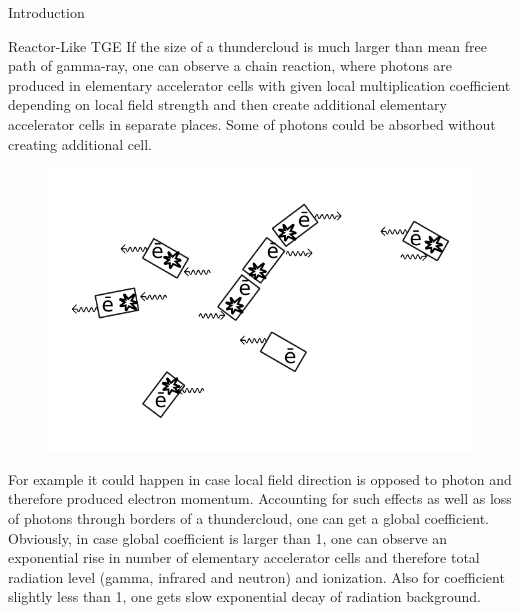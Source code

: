 \documentclass[final,hyperref={pdfpagelabels=false}]{beamer}
\begin{document}
\begin{frame}{}
\begin{columns}[t]
\begin{column}{0.32\linewidth}
\begin{block}{Introduction}
				
			\end{block}
			                
			
			
			\begin{block}{Reactor-Like TGE}
                If the size of a thundercloud is much larger than mean free path of gamma-ray, one can observe a chain reaction, where photons are produced in elementary accelerator cells with given local multiplication coefficient depending on local field strength and then create additional elementary accelerator cells in separate places. Some of photons could be absorbed without creating additional cell. 
                
                \begin{figure}[htb]
                    \centering
                    \includegraphics[width=1\columnwidth]{rltge_1.pdf}
                \end{figure}
                For example it could happen in case local field direction is opposed to photon and therefore produced electron momentum. Accounting for such effects as well as loss of photons through borders of a thundercloud, one can get a global  coefficient. Obviously, in case global coefficient is larger than 1, one can observe an exponential rise in number of elementary accelerator cells and therefore total radiation level (gamma, infrared and neutron) and ionization. Also for coefficient slightly less than 1, one gets slow exponential decay of radiation background.
	
	
				                                  

\end{block}
\end{column}
\end{columns}
\end{frame}
\end{document}
